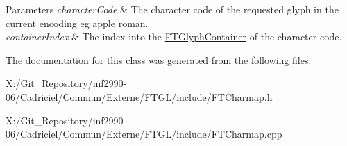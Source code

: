 \begin{DoxyParams}{Parameters}
{\em character\-Code} & The character code of the requested glyph in the current encoding eg apple roman. \\
\hline
{\em container\-Index} & The index into the \hyperlink{class_f_t_glyph_container}{F\-T\-Glyph\-Container} of the character code. \\
\hline
\end{DoxyParams}


The documentation for this class was generated from the following files\-:\begin{DoxyCompactItemize}
\item 
X\-:/\-Git\-\_\-\-Repository/inf2990-\/06/\-Cadriciel/\-Commun/\-Externe/\-F\-T\-G\-L/include/F\-T\-Charmap.\-h\item 
X\-:/\-Git\-\_\-\-Repository/inf2990-\/06/\-Cadriciel/\-Commun/\-Externe/\-F\-T\-G\-L/include/F\-T\-Charmap.\-cpp\end{DoxyCompactItemize}
